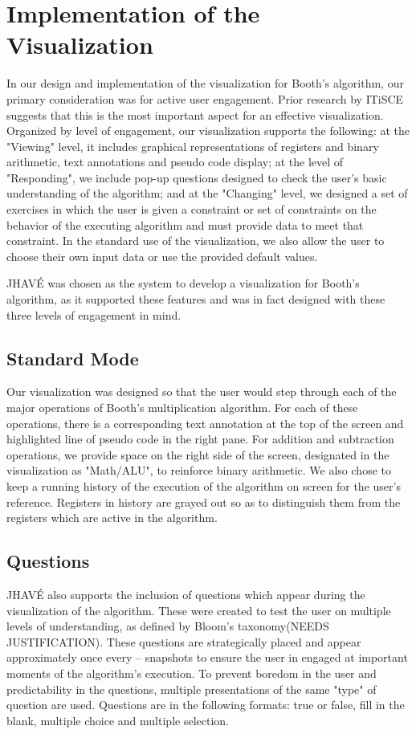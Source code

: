 \documentclass{acm_proc_article-sp}
\begin{document}
\section{Implementation of the Visualization}
In our design and implementation of the visualization for Booth's algorithm, our primary consideration was for active user engagement.
Prior research by ITiSCE suggests that this is the most important aspect for an effective visualization.\cite{ITiSCE}
Organized by level of engagement, our visualization supports the following: at the "Viewing" level, it includes graphical representations of registers and binary arithmetic, text annotations and pseudo code
 display; at the level of "Responding", we include pop-up questions designed to check the user's basic understanding of the algorithm; and at the "Changing" level, we designed a set of exercises in which the user is given a constraint or set of constraints on the behavior of the executing algorithm and must provide data to meet that constraint.
In the standard use of the visualization, we also allow the user to choose their own input data or use the provided default values.

JHAVÉ was chosen as the system to develop a visualization for Booth's algorithm, as it supported these features and was in fact designed with these three levels of engagement in mind.\cite{JHAVE}

\subsection{Standard Mode}
Our visualization was designed so that the user would step through each of the major operations of Booth's multiplication algorithm.
For each of these operations, there is a corresponding text annotation at the top of the screen and highlighted line of pseudo code in the right pane.
For addition and subtraction operations, we provide space on the right side of the screen, designated in the visualization as "Math/ALU", to reinforce binary arithmetic.
We also chose to keep a running history of the execution of the algorithm on screen for the user's reference.
Registers in history are grayed out so as to distinguish them from the registers which are active in the algorithm.
\subsection{Questions}
JHAVÉ also supports the inclusion of questions which appear during the visualization of the algorithm.
These were created to test the user on multiple levels of understanding, as defined by Bloom's taxonomy(NEEDS JUSTIFICATION).
These questions are strategically placed and appear approximately once every -- snapshots to ensure the user in engaged at important moments of the algorithm's execution.
To prevent boredom in the user and predictability in the questions, multiple presentations of the same "type" of question are used.
Questions are in the following formats: true or false, fill in the blank, multiple choice and multiple selection.
\end{document}
